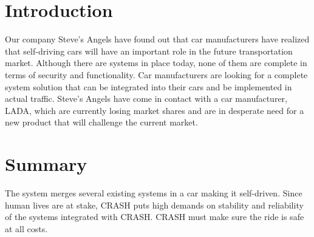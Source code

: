 \documentclass{article}
\begin{document}

\titleformat{\subsubsection}[runin]{\normalsize\bfseries}{}{0pt}{#1\quad\thesubsubsection}


\begingroup
\hypersetup{linkcolor=black}
\tableofcontents
\thispagestyle{empty}
\endgroup
\newpage
\begingroup
\hypersetup{linkcolor=black}
\listoffigures
\thispagestyle{empty}
\endgroup
\newpage
{}

\section{Introduction}
Our company Steve's Angels have found out that car manufacturers have realized that self-driving cars will have an important role in the future transportation market. Although there are systems in place today, none of them are complete in terms of security and functionality. Car manufacturers are looking for a complete system solution that can be integrated into their cars and be implemented in actual traffic. Steve's Angels have come in contact with a car manufacturer, LADA, which are currently losing market shares and are in desperate need for a new product that will challenge the current market. 

\section{Summary}
The system merges several existing systems in a car making it self-driven. Since human lives are at stake, CRASH puts high demands on stability and reliability of the systems integrated with CRASH. CRASH must make sure the ride is safe at all costs.
\end{document}
